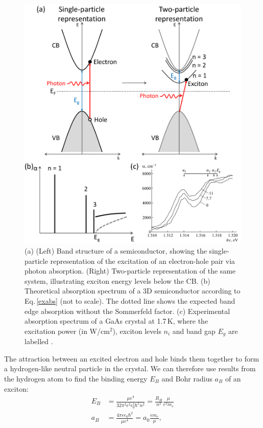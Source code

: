 \begin{figure}[h!] 
\centering    
\includegraphics[width=\textwidth]{Fig1}
\caption{(a) (Left) Band structure of a semiconductor, showing the single-particle representation of the excitation of an electron-hole pair via photon absorption. (Right) Two-particle representation of the same system, illustrating exciton energy levels below the CB. (b) Theoretical absorption spectrum of a 3D semiconductor according to Eq.\,\ref{exabs} (not to scale). The dotted line shows the expected band edge absorption without the Sommerfeld factor. (c) Experimental absorption spectrum of a GaAs crystal at 1.7\,K, where the excitation power (in W/cm$^2$), exciton levels $n_i$ and band gap $E_g$ are labelled \cite{Vaganov2013}.}
\label{2Fig1}
\end{figure}
The attraction between an excited electron and hole binds them together to form a hydrogen-like neutral particle in the crystal. We can therefore use results from the hydrogen atom to find the binding energy $E_B$ and Bohr radius $a_B$ of an exciton:
\begin{subequations}
\label{ex3D}
\begin{align}
E_B &=\frac{\mu e^4}{32\pi^2\epsilon^2\epsilon_0^2\hbar^2n^2} = \frac{R_H}{n^2}\frac{\mu}{\epsilon^2 m_e} \label{exbinding3D}\\
a_B &= \frac{4\pi\epsilon\epsilon_0\hbar^2}{\mu e^4}=a_0\frac{\epsilon m_e}{\mu} \label{exrad3D},
\end{align}
\end{subequations}
